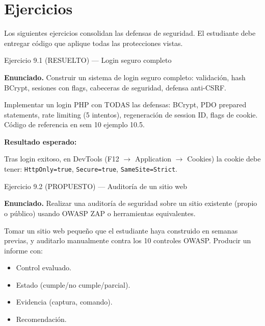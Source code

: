 \documentclass[11pt,a4paper,openany]{book}
\begin{document}
\section{Ejercicios}

Los siguientes ejercicios consolidan las defensas de
seguridad. El estudiante debe entregar código que aplique todas
las protecciones vistas.


\begin{cajaejercicio}{Ejercicio 9.1 (RESUELTO) --- Login seguro completo}


\textbf{Enunciado.} Construir un sistema de login seguro completo: validación, hash BCrypt, sesiones con flags, cabeceras de seguridad, defensa anti-CSRF.

Implementar un login PHP con TODAS las defensas: BCrypt, PDO prepared
statements, rate limiting (5 intentos), regeneración de session ID,
flags de cookie. Código de referencia en sem 10 ejemplo 10.5.

\textbf{Resultado esperado:}


Tras login exitoso, en DevTools (F12 $\rightarrow$ Application
$\rightarrow$ Cookies) la cookie debe tener: \texttt{HttpOnly=true},
\texttt{Secure=true}, \texttt{SameSite=Strict}.
\end{cajaejercicio}

\begin{cajaejercicio}{Ejercicio 9.2 (PROPUESTO) --- Auditoría de un sitio web}


\textbf{Enunciado.} Realizar una auditoría de seguridad sobre un sitio existente (propio o público) usando OWASP ZAP o herramientas equivalentes.

Tomar un sitio web pequeño que el estudiante haya construido en
semanas previas, y auditarlo manualmente contra los 10 controles
OWASP. Producir un informe con:
\begin{itemize}
\item Control evaluado.
\item Estado (cumple/no cumple/parcial).
\item Evidencia (captura, comando).
\item Recomendación.
\end{itemize}
\end{cajaejercicio}
\end{document}
